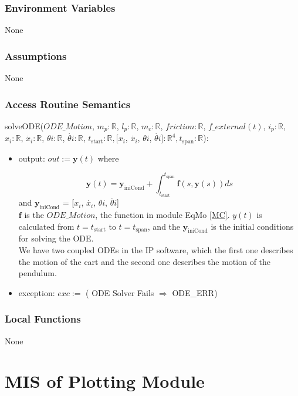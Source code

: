 \documentclass[12pt, titlepage]{article}
\begin{document}
\subsubsection{Environment Variables}
None
\subsubsection{Assumptions}
None

\subsubsection{Access Routine Semantics}

\noindent solveODE($ODE\_Motion$, $ m_p: \mathbb{R}$, $l_p: \mathbb{R}$, $m_c: \mathbb{R}$, $friction: \mathbb{R}$, $f\_external(t)$, $i_p: \mathbb{R}$, $x_i: \mathbb{R}$, $\dot{x_i}: \mathbb{R}$, $\theta{i}: \mathbb{R}$, $\dot{\theta{i}}: \mathbb{R}$,  $t_\text{start}: \mathbb{R}$$, $[$x_i$, $\dot{x_i}$, $\theta{i}$, $\dot{\theta{i}}$]$: \mathbb{R}^4, t_\text{span}: \mathbb{R}$):\\ 
\begin{itemize}
\item output: $out := \textbf{y}(t)$ where 

$$\textbf{y}(t) = \textbf{y}_\text{iniCond} + \int_{t_\text{start}}^{t_\text{span}} \textbf{f}(s, \textbf{y}(s)) ds$$ and
$\textbf{y}_\text{iniCond}$ = [$x_i$, $\dot{x_i}$, $\theta{i}$, $\dot{\theta{i}}$]\\

 $\textbf{f}$ is the $ODE\_Motion$, the function in module EqMo \ref{MC}. $y(t)$ is calculated from $t = t_\text{start}$ to $t = t_\text{span}$, and the $\textbf{y}_\text{iniCond}$ is the initial conditions for solving the ODE.\\
We have two coupled ODEs in the IP software, which the first one describes the motion of the cart and the second one describes the motion of the pendulum.

\item exception: $exc :=$ ( ODE Solver Fails $\Rightarrow$ ODE\_ERR)
\end{itemize}

\subsubsection{Local Functions}
None
\newpage


\section{MIS of Plotting Module \label{MPlot}}
\end{document}
